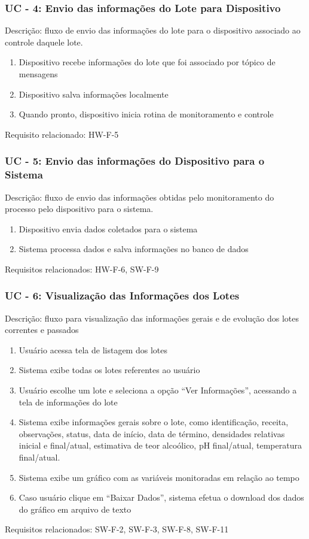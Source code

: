 \subsubsection*{UC - 4: Envio das informações do Lote para Dispositivo}
Descrição: fluxo de envio das informações do lote para o dispositivo associado ao controle daquele lote.
\begin{enumerate}
    \item Dispositivo recebe informações do lote que foi associado por tópico de mensagens
    \item Dispositivo salva informações localmente
    \item Quando pronto, dispositivo inicia rotina de monitoramento e controle
\end{enumerate}    
Requisito relacionado: HW-F-5

\subsubsection*{UC - 5: Envio das informações do Dispositivo para o Sistema}
Descrição: fluxo de envio das informações obtidas pelo monitoramento do processo pelo dispositivo para o sistema.
\begin{enumerate}
    \item Dispositivo envia dados coletados para o sistema
    \item Sistema processa dados e salva informações no banco de dados
\end{enumerate}    
Requisitos relacionados: HW-F-6, SW-F-9

\subsubsection*{UC - 6: Visualização das Informações dos Lotes}
Descrição: fluxo para visualização das informações gerais e de evolução dos lotes correntes e passados
\begin{enumerate}
    \item Usuário acessa tela de listagem dos lotes
    \item Sistema exibe todas os lotes referentes ao usuário
    \item Usuário escolhe um lote e seleciona a opção “Ver Informações”, acessando a tela de informações do lote
    \item Sistema exibe informações gerais sobre o lote, como identificação, receita, observações, status, data de início, data de término, densidades relativas inicial e final/atual, estimativa de teor alcoólico, pH final/atual, temperatura final/atual.
    \item Sistema exibe um gráfico com as variáveis monitoradas em relação ao tempo
    \item Caso usuário clique em “Baixar Dados”, sistema efetua o download dos dados do gráfico em arquivo de texto
\end{enumerate}    
Requisitos relacionados: SW-F-2, SW-F-3, SW-F-8, SW-F-11


